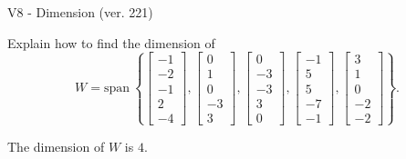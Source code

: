 \begin{exercise}
  \begin{exerciseTitle}V8 - Dimension (ver. 221)\end{exerciseTitle}
  \begin{exerciseStatement}
    Explain how to find the dimension of 
\[W=\mathrm{span}\ \left\{\left[\begin{array}{r}
-1 \\
-2 \\
-1 \\
2 \\
-4
\end{array}\right] , \left[\begin{array}{r}
0 \\
1 \\
0 \\
-3 \\
3
\end{array}\right] , \left[\begin{array}{r}
0 \\
-3 \\
-3 \\
3 \\
0
\end{array}\right] , \left[\begin{array}{r}
-1 \\
5 \\
5 \\
-7 \\
-1
\end{array}\right] , \left[\begin{array}{r}
3 \\
1 \\
0 \\
-2 \\
-2
\end{array}\right]\right\}.\]



  \end{exerciseStatement}
  \begin{exerciseAnswer}
   The dimension of \(W\) is  \(4\).
  


  \end{exerciseAnswer}
\end{exercise}